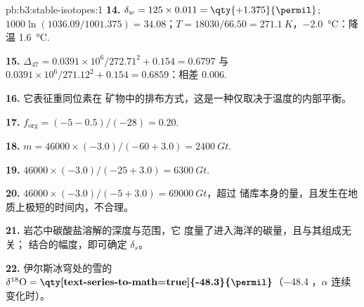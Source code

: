 \begin{solution}{pb:b3:stable-isotopes:1}
\textbf{14.} $\delta_w = 125\times0.011 = \qty{+1.375}{\permil}$; $1000\ln(1036.09/1001.375)
= 34.08$；$T = 18030/66.50 = \qty{271.1}{K}$，\qty{-2.0}{\celsius}：降温
\qty{1.6}{\celsius}.

\textbf{15.} $\Delta_{47} = 0.0391\times10^6/272.71^2 + 0.154 = 0.6797$ 与
$0.0391\times10^6/271.12^2 + 0.154 = 0.6859$：相差
\qty{0.006}{\permil}.

\textbf{16.} 它表征重同位素在
矿物中的排布方式，这是一种仅取决于温度的内部平衡。

\textbf{17.} $f_{\mathrm{org}} = (-5 - 0.5)/(-28) = 0.20$.

\textbf{18.} $m = 46000\times(-3.0)/(-60 + 3.0) = \qty{2400}{Gt}$.

\textbf{19.} $46000\times(-3.0)/(-25 + 3.0) = \qty{6300}{Gt}$.

\textbf{20.} $46000\times(-3.0)/(-5 + 3.0) = \qty{69000}{Gt}$，超过
储库本身的量，且发生在地质上极短的时间内，不合理。

\textbf{21.} 岩芯中碳酸盐溶解的深度与范围，它
度量了进入海洋的碳量，且与其组成无关；
结合的幅度，即可确定 $\delta_s$。

\textbf{22.} 伊尔斯冰穹处的雪的 $\delta^{18}\mathrm O =
\textbf{\qty[text-series-to-math=true]{-48.3}{\permil}}$（\qty{-48.4}{\permil}
，$\alpha$ 连续变化时）。
\end{solution}
